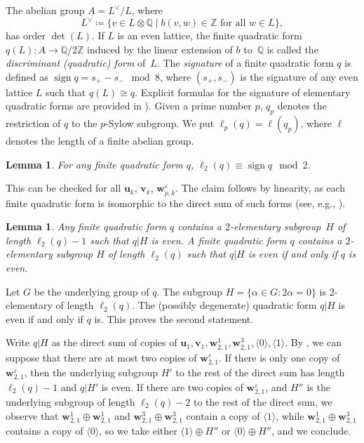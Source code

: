 \documentclass[a4paper]{amsart}
\theoremstyle{definition}
\theoremstyle{plain}
\newtheorem{lemma}[definition]{Lemma}
\DeclareMathOperator{\sign}{sign}
\newcommand{\IQ}{\mathbb{Q}}
\newcommand{\IZ}{\mathbb{Z}}
\newcommand{\bu}{\mathbf{u}}
\newcommand{\bv}{\mathbf{v}}
\newcommand{\bw}{\mathbf{w}}
\begin{document}
The abelian group \(A = L^\vee/L\), where 
\[
    L^\vee \coloneqq \{v \in L \otimes \IQ \mid \text{\(b(v,w) \in \IZ\) for all \(w \in L\)}\},
\]
has order \(\det(L)\).
If \(L\) is an even lattice, the finite quadratic form \(q(L)\colon A \rightarrow \IQ/2\IZ\) induced by the linear extension of \(b\) to~\(\IQ\) is called the \emph{discriminant (quadratic) form} of~\(L\). 
The \emph{signature} of a finite quadratic form \(q\) is defined as \(\sign q = s_+ - s_- \mod 8\), where \((s_+,s_-)\) is the signature of any even lattice \(L\) such that \(q(L) \cong q\). 
Explicit formulas for the signature of elementary quadratic forms are provided in \cite[Proposition 1.11.2]{Nikulin:int.sym.bilinear.forms}). 
Given a prime number \(p\), \(q_p\) denotes the restriction of \(q\) to the \(p\)-Sylow subgroup. 
We put \(\ell_p(q) = \ell(q_p)\), where \(\ell\) denotes the length of a finite abelian group.

\begin{lemma} \label{lem:parity-l2}
For any finite quadratic form \(q\), \(\ell_2(q) \equiv \sign q \mod 2\).
\end{lemma}
\proof 
This can be checked for all \(\bu_k\), \(\bv_k\), \(\bw^\varepsilon_{p,k}\). The claim follows by linearity, as each finite quadratic form is isomorphic to the direct sum of such forms (see, e.g., \cite[Proposition~1.8.1]{Nikulin:int.sym.bilinear.forms}). %
\endproof 


\begin{lemma} \label{lem:2-elementary-even-subgroup}
Any finite quadratic form \(q\) contains a \(2\)-elementary subgroup~\(H\) of length \(\ell_2(q) - 1\) such that \(q|H\) is even. A finite quadratic form \(q\) contains a \(2\)-elementary subgroup \(H\) of length \(\ell_2(q)\) such that \(q|H\) is even if and only if \(q\) is even.
\end{lemma}
\proof
Let \(G\) be the underlying group of \(q\).
The subgroup \(H = \{\alpha \in G: 2\alpha = 0\}\) is \(2\)-elementary of length \(\ell_2(q)\). The (possibly degenerate) quadratic form \(q|H\) is even if and only if \(q\) is. This proves the second statement.

Write \(q|H\) as the direct sum of copies of \(\bu_1, \bv_1, \bw^1_{2,1}, \bw^3_{2,1}, \langle 0 \rangle, \langle 1 \rangle\).
By \cite[Proposition~1.8.2]{Nikulin:int.sym.bilinear.forms}, we can suppose that there are at most two copies of \(\bw^\varepsilon_{2,1}\). 
If there is only one copy of \(\bw^\varepsilon_{2,1}\), then the underlying subgroup \(H'\) to the rest of the direct sum has length \(\ell_2(q)-1\) and \(q|H'\) is even. 
If there are two copies of \(\bw^\varepsilon_{2,1}\), and \(H''\) is the underlying subgroup of length \(\ell_2(q) -2\) to the rest of the direct sum, we observe that \(\bw^1_{2,1} \oplus \bw^1_{2,1}\) and \(\bw^3_{2,1} \oplus \bw^3_{2,1}\) contain a copy of \(\langle 1 \rangle\), while \(\bw^1_{2,1} \oplus \bw^3_{2,1}\) contains a copy of \(\langle 0 \rangle\), so we take either \(\langle 1 \rangle \oplus H''\) or \(\langle 0 \rangle \oplus H''\), and we conclude. 
\endproof 
\end{document}
